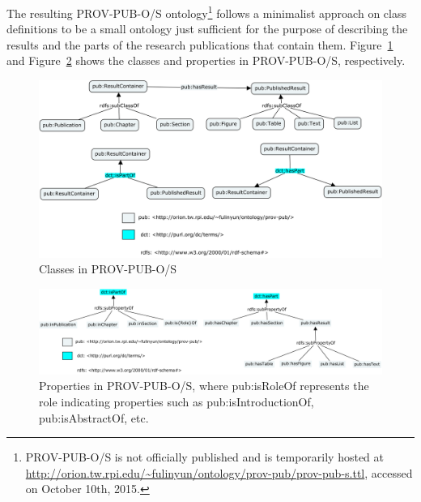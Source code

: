 The resulting PROV-PUB-O/S ontology\footnote{PROV-PUB-O/S is not officially published and is temporarily hosted at \url{http://orion.tw.rpi.edu/~fulinyun/ontology/prov-pub/prov-pub-s.ttl}, accessed on October 10th, 2015.} follows a minimalist approach on class definitions to be a small ontology just sufficient for the purpose of describing the results and the parts of the research publications that contain them. Figure~\ref{fig:prov-pub-s-classes} and Figure~\ref{fig:prov-pub-s-properties} shows the classes and properties in PROV-PUB-O/S, respectively.

\begin{figure}[h]
	\includegraphics[width=\textwidth]{model/ontology/prov-pub/prov-pub-s-classes.png}
	\caption{Classes in PROV-PUB-O/S}
	\label{fig:prov-pub-s-classes}
\end{figure}

\begin{figure}[h]
	\includegraphics[width=\textwidth]{model/ontology/prov-pub/prov-pub-s-properties.png}
	\caption[Properties in PROV-PUB-O/S]{Properties in PROV-PUB-O/S, where pub:is{Role}Of represents the role indicating properties such as pub:isIntroductionOf, pub:isAbstractOf, etc.}
	\label{fig:prov-pub-s-properties}
\end{figure}



